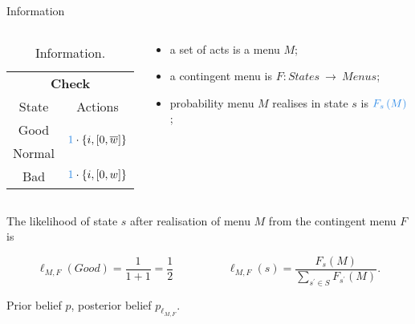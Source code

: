 \documentclass[usenames,dvipsnames,aspectratio=169,11pt, envcountsect, handout]{beamer}
\begin{document}
\begin{frame}[noframenumbering]{Information}

	\begin{columns}
		\begin{column}{0.35\textwidth} %
			\begin{center}
				\begin{table}
					\centering
					\begin{tabular}{c | c}
						\multicolumn{2}{c}{\textbf{Check}}                                                                           \\
						State  & Actions                                                                                             \\
						\hline
						Good   & \multirow{2}{*}{\( \textcolor{blue}{1} \cdot \left\{ i, \left[ 0, \overline{w} \right] \right\} \)} \\
						Normal &                                                                                                     \\
						Bad    & \(\textcolor{blue}{1} \cdot \left\{ i, \left[0, w \right] \right\} \)                               \\
					\end{tabular}
					\caption{Information.}
					\label{tab:info1}
				\end{table}
			\end{center}
		\end{column}

		\begin{column}{0.65\textwidth} %
			\begin{itemize}
				\item a set of acts is a menu \( M  \);
				\item a contingent menu is \(F: States \: \rightarrow \: Menus \);
				\item probability menu \( M \) realises in state \( s \) is \( \textcolor{blue}{F_s \left( M \right)} \);
			\end{itemize}
		\end{column}
	\end{columns}

	\vfill

	The likelihood of state \(s\) after realisation of menu \(M\) from the contingent menu \(F\) is

	\vfill

	\[ \ell_{M, F} \left( Good \right) = \frac{1}{1+1} = \frac{1}{2} \hspace{2cm} \ell_{M, F} \left( s \right) = \frac{F_{s} \left( M \right)}{ \sum_{s^{\prime} \in S} F_{s^{\prime}} \left( M \right)} .
	\] \pause

	\vfill

	Prior belief \( p \), posterior belief \( p_{\ell_{M, F}} \).

\end{frame}
\end{document}
